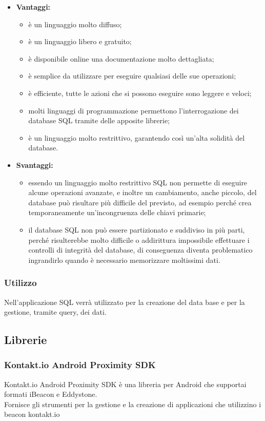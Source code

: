 	\begin{itemize}
		\item \textbf{Vantaggi:}
			\begin{itemize}
				\item è un linguaggio molto diffuso;
				\item è un linguaggio libero e gratuito;
				\item è disponibile online una documentazione molto dettagliata;
				\item è semplice da utilizzare per eseguire qualsiasi delle sue operazioni;
				\item è efficiente, tutte le azioni che si possono eseguire sono leggere e veloci;
				\item molti linguaggi di programmazione permettono l'interrogazione dei database SQL tramite delle apposite librerie;
				\item è un linguaggio molto restrittivo, garantendo così un'alta solidità del database.
			\end{itemize}
		\item \textbf{Svantaggi:}
			\begin{itemize}
				\item essendo un linguaggio molto restrittivo SQL non permette di eseguire alcune operazioni avanzate, e inoltre un cambiamento, anche piccolo, del database può risultare più difficile del previsto, ad esempio perché crea temporaneamente un'incongruenza delle chiavi primarie;
				\item il database SQL non può essere partizionato e suddiviso in più parti, perché risulterebbe molto difficile o addirittura impossibile effettuare i controlli di integrità del database, di conseguenza diventa problematico ingrandirlo quando è necessario memorizzare moltissimi dati.
			\end{itemize}
	\end{itemize}
	\subsubsection{Utilizzo}
	Nell'applicazione SQL verrà utilizzato per la creazione del data base e per la gestione, tramite query, dei dati.

\subsection{Librerie}
\subsubsection{Kontakt.io Android Proximity SDK}
	Kontakt.io Android Proximity SDK è una libreria per Android che supportai formati iBeacon e Eddystone.\\
	Fornisce gli strumenti per la gestione e la creazione di applicazioni che utilizzino i beacon kontakt.io
	
